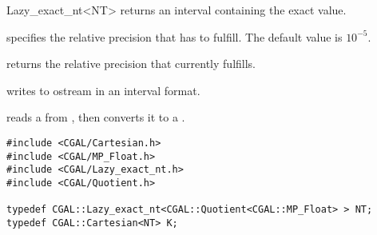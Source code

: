 \begin{ccRefClass} {Lazy_exact_nt<NT>}
 {returns an interval containing the 
exact value.}

{specifies the relative precision that  has to fulfill.
The default value is $10^{-5}$.  }

{returns the relative precision that  currently fulfills.}

{writes  to ostream  in an interval format.}

{reads a  from , then converts it to a .}

\ccExample

\begin{verbatim}
#include <CGAL/Cartesian.h>
#include <CGAL/MP_Float.h>
#include <CGAL/Lazy_exact_nt.h>
#include <CGAL/Quotient.h>

typedef CGAL::Lazy_exact_nt<CGAL::Quotient<CGAL::MP_Float> > NT;
typedef CGAL::Cartesian<NT> K;
\end{verbatim}

\end{ccRefClass} 

